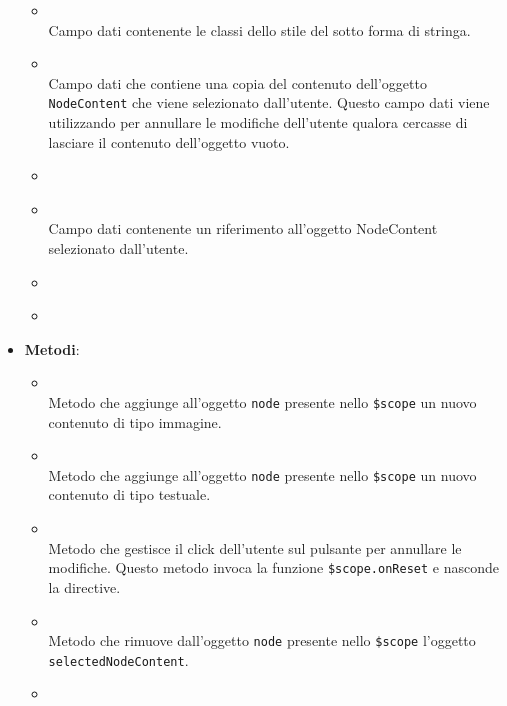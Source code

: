\begin{itemize}
\begin{itemize}
\item {}
\\ Campo dati contenente le classi  dello stile del  sotto forma di stringa.
\item {}
\\ Campo dati che contiene una copia del contenuto dell'oggetto \texttt{NodeContent} che viene selezionato dall'utente. Questo campo dati viene utilizzando per annullare le modifiche dell'utente qualora cercasse di lasciare il contenuto dell'oggetto vuoto.
\item {}
\\ \dpProjectServiceField
\item {}
\\ Campo dati contenente un riferimento all'oggetto NodeContent selezionato dall'utente.
\item {}
\\ \dpMDDialogServiceField
\item {}
\\ \dpScopeField
\end{itemize}
\item \textbf{Metodi}:
\begin{itemize}
\item {}
\\ Metodo che aggiunge all'oggetto \texttt{node} presente nello \texttt{\$scope} un nuovo contenuto di tipo immagine.
\item {}
\\ Metodo che aggiunge all'oggetto \texttt{node} presente nello \texttt{\$scope} un nuovo contenuto di tipo testuale.
\item {}
\\ Metodo che gestisce il click dell'utente sul pulsante per annullare le modifiche. Questo metodo invoca la funzione \texttt{\$scope.onReset} e nasconde la directive.
\item {}
\\ Metodo che rimuove dall'oggetto \texttt{node} presente nello \texttt{\$scope} l'oggetto \texttt{selectedNodeContent}.
\item {}

\end{itemize}
\end{itemize}
